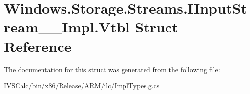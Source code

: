 \hypertarget{struct_windows_1_1_storage_1_1_streams_1_1_i_input_stream_____impl_1_1_vtbl}{}\section{Windows.\+Storage.\+Streams.\+I\+Input\+Stream\+\_\+\+\_\+\+Impl.\+Vtbl Struct Reference}
\label{struct_windows_1_1_storage_1_1_streams_1_1_i_input_stream_____impl_1_1_vtbl}


The documentation for this struct was generated from the following file\+:\begin{DoxyCompactItemize}
\item 
I\+V\+S\+Calc/bin/x86/\+Release/\+A\+R\+M/ilc/Impl\+Types.\+g.\+cs\end{DoxyCompactItemize}
